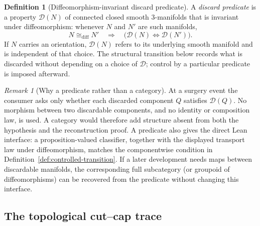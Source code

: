 \documentclass[10pt]{coll-l}
\newcommand{\diffeo}{\mathrel{\cong_{\mathrm{diff}}}}
\theoremstyle{definition}
\newtheorem{definition}[theorem]{Definition}
\theoremstyle{remark}
\newtheorem{remark}[theorem]{Remark}
\numberwithin{section}{chapter}
\numberwithin{equation}{chapter}
\begin{document}
\begin{definition}[Diffeomorphism-invariant discard predicate]
\label{def:discard-predicate}
A \emph{discard predicate} is a property $\mathcal D(N)$ of connected closed
smooth $3$-manifolds that is invariant under diffeomorphism: whenever $N$ and
$N'$ are such manifolds,
\[
  N\diffeo N'
  \quad\Longrightarrow\quad
  \bigl(\mathcal D(N)\Longleftrightarrow\mathcal D(N')\bigr).
\]
If $N$ carries an orientation, $\mathcal D(N)$ refers to its underlying
smooth manifold and is independent of that choice.  The structural
transition below records what is discarded without depending on a choice of
$\mathcal D$; control by a particular predicate is imposed afterward.
\end{definition}

\begin{remark}[Why a predicate rather than a category]
At a surgery event the consumer asks only whether each discarded component
$Q$ satisfies $\mathcal D(Q)$.  No morphism between two discardable
components, and no identity or composition law, is used.  A category would
therefore add structure absent from both the hypothesis and the
reconstruction proof.  A predicate also gives the direct Lean interface: a
proposition-valued classifier, together with the displayed transport law
under diffeomorphism, matches the componentwise condition in
Definition~\ref{def:controlled-transition}.  If a later development needs
maps between discardable manifolds, the corresponding full subcategory (or
groupoid of diffeomorphisms) can be recovered from the predicate without
changing this interface.
\end{remark}

\subsection{The topological cut--cap trace}
\end{document}
